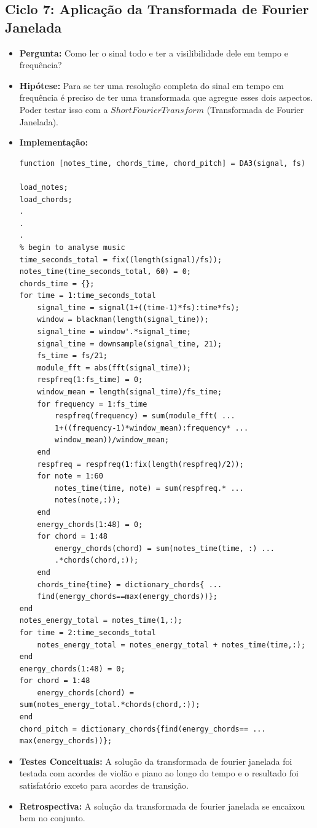 \subsection{Ciclo 7: Aplicação da Transformada de Fourier Janelada}
\label{subsec:ciclo_7}
\begin{itemize}
\item \textbf{Pergunta:} Como ler o sinal todo e ter a visilibilidade dele em tempo e frequência?
\item \textbf{Hipótese:} Para se ter uma resolução completa do sinal em tempo em frequência é preciso de ter uma transformada que agregue esses dois aspectos. Poder testar isso com a $Short Fourier Transform$ (Transformada de Fourier Janelada).   
\item \textbf{Implementação:} 
\begin{lstlisting}
function [notes_time, chords_time, chord_pitch] = DA3(signal, fs)

load_notes;
load_chords;
.
.
.
% begin to analyse music
time_seconds_total = fix((length(signal)/fs));
notes_time(time_seconds_total, 60) = 0;
chords_time = {};
for time = 1:time_seconds_total
    signal_time = signal(1+((time-1)*fs):time*fs);
    window = blackman(length(signal_time));
    signal_time = window'.*signal_time;
    signal_time = downsample(signal_time, 21);
    fs_time = fs/21;
    module_fft = abs(fft(signal_time));
    respfreq(1:fs_time) = 0;
    window_mean = length(signal_time)/fs_time;
    for frequency = 1:fs_time
        respfreq(frequency) = sum(module_fft( ...
        1+((frequency-1)*window_mean):frequency* ...
        window_mean))/window_mean;
    end
    respfreq = respfreq(1:fix(length(respfreq)/2));
    for note = 1:60
        notes_time(time, note) = sum(respfreq.* ...
        notes(note,:));    
    end
    energy_chords(1:48) = 0;
    for chord = 1:48
        energy_chords(chord) = sum(notes_time(time, :) ...
        .*chords(chord,:));
    end
    chords_time{time} = dictionary_chords{ ...
    find(energy_chords==max(energy_chords))};
end
notes_energy_total = notes_time(1,:);
for time = 2:time_seconds_total
    notes_energy_total = notes_energy_total + notes_time(time,:);
end
energy_chords(1:48) = 0;
for chord = 1:48
    energy_chords(chord) = sum(notes_energy_total.*chords(chord,:));
end
chord_pitch = dictionary_chords{find(energy_chords== ...
max(energy_chords))};
\end{lstlisting}
\item \textbf{Testes Conceituais:} A solução da transformada de fourier janelada foi testada com acordes de violão e piano ao longo do tempo e o resultado foi satisfatório exceto para acordes de transição.
\item \textbf{Retrospectiva:} A solução da transformada de fourier janelada se encaixou bem no conjunto.  
\end{itemize}

